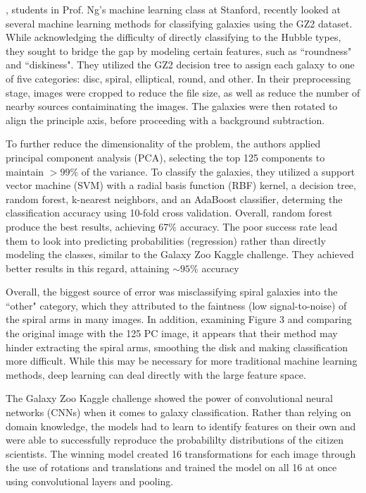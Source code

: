 \documentclass{article}
\begin{document}
\cite{stanford}, students in Prof. Ng's machine learning class at Stanford, recently looked at several machine learning methods for classifying galaxies using the GZ2 dataset. While acknowledging the difficulty of directly classifying to the Hubble types, they sought to bridge the gap by modeling certain features, such as ``roundness" and ``diskiness". They utilized the GZ2 decision tree to assign each galaxy to one of five categories: disc, spiral, elliptical, round, and other. In their preprocessing stage, images were cropped to reduce the file size, as well as reduce the number of nearby sources contaiminating the images. The galaxies were then rotated to align the principle axis, before proceeding with a background subtraction.

To further reduce the dimensionality of the problem, the authors applied principal component analysis (PCA), selecting the top 125 components to maintain $>99\%$ of the variance. To classify the galaxies, they utilized a support vector machine (SVM) with a radial basis function (RBF) kernel, a decision tree, random forest, k-nearest neighbors, and an AdaBoost classifier, determing the classification accuracy using 10-fold cross validation. Overall, random forest produce the best results, achieving 67\% accuracy. The poor success rate lead them to look into predicting probabilities (regression) rather than directly modeling the classes, similar to the Galaxy Zoo Kaggle challenge. They achieved better results in this regard, attaining $\sim 95\%$ accuracy

Overall, the biggest source of error was misclassifying spiral galaxies into the ``other" category, which they attributed to the faintness (low signal-to-noise) of the spiral arms in many images. In addition, examining Figure 3 and comparing the original image with the 125 PC image, it appears that their method may hinder extracting the spiral arms, smoothing the disk and making classification more difficult. While this may be necessary for more traditional machine learning methods, deep learning can deal directly with the large feature space.

The Galaxy Zoo Kaggle challenge showed the power of convolutional neural networks (CNNs) when it comes to galaxy classification. Rather than relying on domain knowledge, the models had to learn to identify features on their own and were able to successfully reproduce the probabililty distributions of the citizen scientists. The winning model created 16 transformations for each image through the use of rotations and translations and trained the model on all 16 at once using convolutional layers and pooling.
\end{document}
